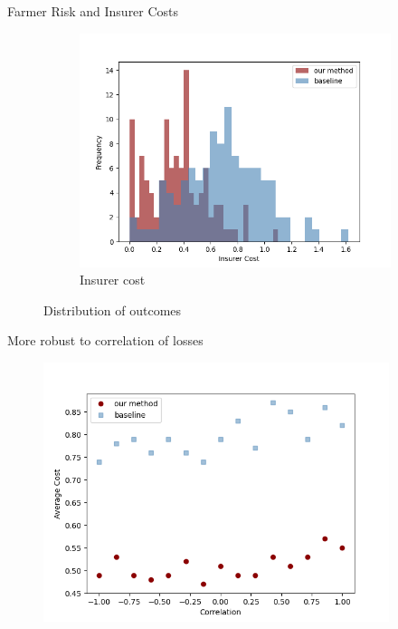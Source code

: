 \documentclass{beamer}
\begin{document}
\begin{frame}{Farmer Risk and Insurer Costs}
\begin{figure}
\begin{subfigure}[b]{0.47\textwidth}
    \includegraphics[width=\textwidth]{../../../output/figures/Logit_Bootstrap/insurer_cost_no_corr_linear.png}
    \caption{Insurer cost}
  \end{subfigure}
  \caption{Distribution of outcomes}
\end{figure}
\end{frame}

\begin{frame}{More robust to correlation of losses}
    \begin{figure}
        \centering
        \includegraphics[width=0.9\textwidth]{../../../output/figures/Logit_Bootstrap/cost_vs_corr_linear_exploration.png}
    \end{figure}
\end{frame}
\end{document}
